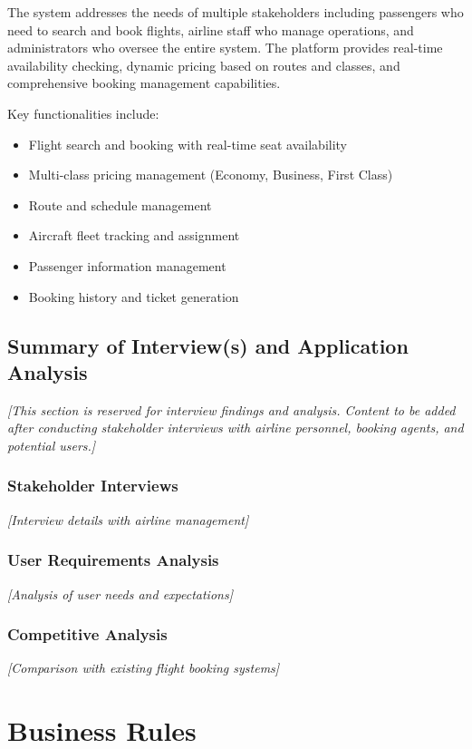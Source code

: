 \documentclass[12pt,a4paper,openany]{report}
\begin{document}
The system addresses the needs of multiple stakeholders including passengers who need to search and book flights, airline staff who manage operations, and administrators who oversee the entire system. The platform provides real-time availability checking, dynamic pricing based on routes and classes, and comprehensive booking management capabilities.

Key functionalities include:
\begin{itemize}
    \item Flight search and booking with real-time seat availability
    \item Multi-class pricing management (Economy, Business, First Class)
    \item Route and schedule management
    \item Aircraft fleet tracking and assignment
    \item Passenger information management
    \item Booking history and ticket generation
\end{itemize}

\section{Summary of Interview(s) and Application Analysis}

\textit{[This section is reserved for interview findings and analysis. Content to be added after conducting stakeholder interviews with airline personnel, booking agents, and potential users.]}

\subsection{Stakeholder Interviews}
\textit{[Interview details with airline management]}

\subsection{User Requirements Analysis}
\textit{[Analysis of user needs and expectations]}

\subsection{Competitive Analysis}
\textit{[Comparison with existing flight booking systems]}

\newpage

\chapter{Business Rules}
\end{document}
